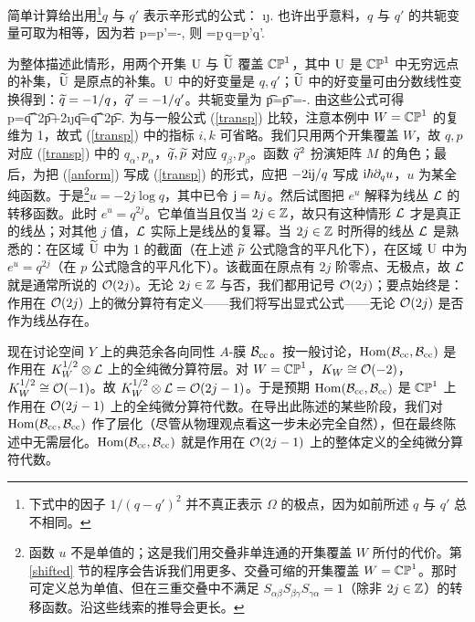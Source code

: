 简单计算给出用\footnote{下式中的因子 $1/(q-q')^2$ 并不真正表示 $\Omega$ 的极点，因为如前所述 $q$ 与 $q'$ 总不相同。}$q$ 与 $q'$ 表示辛形式的公式：
\be\label{shortform}\i\j{}.\ee
也许出乎意料，$q$ 与 $q'$ 的共轭变量可取为相等，因为若
\be\label{momform} p=p'=-, \ee
则
\be\label{canform}\Omega=\d p\,\d q=\d p'\d q'. \ee

为整体描述此情形，用两个开集 ${\mathrm U}$ 与 $\widetilde{{\mathrm U}}$ 覆盖 ${\mathbb{CP}}^1$，其中 ${\mathrm U}$ 是 ${\mathbb{CP}}^1$ 中无穷远点的补集，$\widetilde{{\mathrm U}}$ 是原点的补集。${\mathrm U}$ 中的好变量是 $q,q'$；$\widetilde{{\mathrm U}}$ 中的好变量可由分数线性变换得到：$\widetilde q=-1/q$，$\widetilde q'=-1/q'$。共轭变量为
\be\label{ranform} \t p=\t p'=-. \ee
由这些公式可得
\be\label{anform}p=\t q^2\t p+2\i\j\t q=\t q^2\t p-. \ee
为与一般公式 (\ref{transp}) 比较，注意本例中 $W={\mathbb{CP}}^1$ 的复维为 1，故式 (\ref{transp}) 中的指标 $i,k$ 可省略。我们只用两个开集覆盖 $W$，故 $q,p$ 对应 (\ref{transp}) 中的 $q_\alpha,p_\alpha$，$\widetilde q,\widetilde p$ 对应 $q_\beta,p_\beta$。函数 $\widetilde q^2$ 扮演矩阵 $M$ 的角色；最后，为把 (\ref{anform}) 写成 (\ref{transp}) 的形式，应把 $-2{\mathrm i}{\sf j}/q$ 写成 ${\mathrm i}\hbar\partial_q u$，$u$ 为某全纯函数。于是\footnote{函数 $u$ 不是单值的；这是我们用交叠非单连通的开集覆盖 $W$ 所付的代价。第 \ref{shifted} 节的程序会告诉我们用更多、交叠可缩的开集覆盖 $W={\mathbb{CP}}^1$。那时可定义总为单值、但在三重交叠中不满足 $S_{\alpha\beta}S_{\beta\gamma}S_{\gamma\alpha}=1$（除非 $2j\in{\mathbb Z}$）的转移函数。沿这些线索的推导会更长。}$u=-2j\log q$，其中已令 ${\sf j}=\hbar j$。然后试图把 $e^u$ 解释为线丛 ${\mathcal L}$ 的转移函数。此时 $e^u=q^{2j}$。它单值当且仅当 $2j\in{\mathbb Z}$，故只有这种情形 ${\mathcal L}$ 才是真正的线丛；对其他 $j$ 值，${\mathcal L}$ 实际上是线丛的复幂。当 $2j\in{\mathbb Z}$ 时所得的线丛 ${\mathcal L}$ 是熟悉的：在区域 $\widetilde{{\mathrm U}}$ 中为 1 的截面（在上述 $\widetilde p$ 公式隐含的平凡化下），在区域 ${\mathrm U}$ 中为 $e^u=q^{2j}$（在 $p$ 公式隐含的平凡化下）。该截面在原点有 $2j$ 阶零点、无极点，故 ${\mathcal L}$ 就是通常所说的 ${\mathcal O}(2j)$。无论 $2j\in{\mathbb Z}$ 与否，我们都用记号 ${\mathcal O}(2j)$；要点始终是：作用在 ${\mathcal O}(2j)$ 上的微分算符有定义——我们将写出显式公式——无论 ${\mathcal O}(2j)$ 是否作为线丛存在。

现在讨论空间 $Y$ 上的典范余各向同性 $A$-膜 ${\mathcal B}_{\mathrm{cc}}$。按一般讨论，${\mathrm{Hom}}({\mathcal B}_{\mathrm{cc}},{\mathcal B}_{\mathrm{cc}})$ 是作用在 $K_W^{1/2}\otimes{\mathcal L}$ 上的全纯微分算符层。对 $W={\mathbb{CP}}^1$，$K_W\cong{\mathcal O}(-2)$，$K_W^{1/2}\cong{\mathcal O}(-1)$。故 $K_W^{1/2}\otimes{\mathcal L}={\mathcal O}(2j-1)$。于是预期 ${\mathrm{Hom}}({\mathcal B}_{\mathrm{cc}},{\mathcal B}_{\mathrm{cc}})$ 是 ${\mathbb{CP}}^1$ 上作用在 ${\mathcal O}(2j-1)$ 上的全纯微分算符代数。在导出此陈述的某些阶段，我们对 ${\mathrm{Hom}}({\mathcal B}_{\mathrm{cc}},{\mathcal B}_{\mathrm{cc}})$ 作了层化（尽管从物理观点看这一步未必完全自然），但在最终陈述中无需层化。${\mathrm{Hom}}({\mathcal B}_{\mathrm{cc}},{\mathcal B}_{\mathrm{cc}})$ 就是作用在 ${\mathcal O}(2j-1)$ 上的整体定义的全纯微分算符代数。

